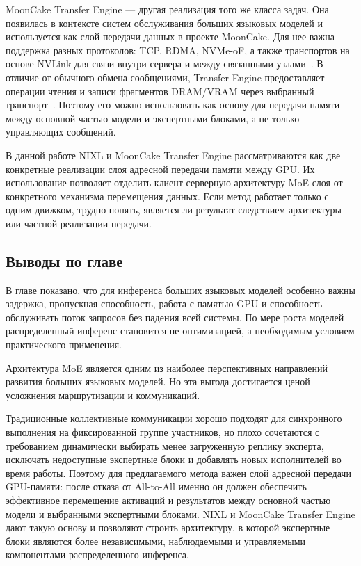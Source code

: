 MoonCake Transfer Engine --- другая реализация того же класса задач. Она появилась в контексте систем обслуживания больших языковых моделей и используется как слой передачи данных в проекте MoonCake. Для нее важна поддержка разных протоколов: TCP, RDMA, NVMe-oF, а также транспортов на основе NVLink для связи внутри сервера и между связанными узлами~\cite{mooncakeSupportedProtocols}. В отличие от обычного обмена сообщениями, Transfer Engine предоставляет операции чтения и записи фрагментов DRAM/VRAM через выбранный транспорт~\cite{mooncakeTransferEngine}. Поэтому его можно использовать как основу для передачи памяти между основной частью модели и экспертными блоками, а не только управляющих сообщений.

В данной работе NIXL и MoonCake Transfer Engine рассматриваются как две конкретные реализации слоя адресной передачи памяти между GPU. Их использование позволяет отделить клиент-серверную архитектуру MoE слоя от конкретного механизма перемещения данных. Если метод работает только с одним движком, трудно понять, является ли результат следствием архитектуры или частной реализации передачи.

\subsection*{Выводы по главе}

В главе показано, что для инференса больших языковых моделей особенно важны задержка, пропускная способность, работа с памятью GPU и способность обслуживать поток запросов без падения всей системы. По мере роста моделей распределенный инференс становится не оптимизацией, а необходимым условием практического применения.

Архитектура MoE является одним из наиболее перспективных направлений развития больших языковых моделей. Но эта выгода достигается ценой усложнения маршрутизации и коммуникаций.

Традиционные коллективные коммуникации хорошо подходят для синхронного выполнения на фиксированной группе участников, но плохо сочетаются с требованием динамически выбирать менее загруженную реплику эксперта, исключать недоступные экспертные блоки и добавлять новых исполнителей во время работы. Поэтому для предлагаемого метода важен слой адресной передачи GPU-памяти: после отказа от All-to-All именно он должен обеспечить эффективное перемещение активаций и результатов между основной частью модели и выбранными экспертными блоками. NIXL и MoonCake Transfer Engine дают такую основу и позволяют строить архитектуру, в которой экспертные блоки являются более независимыми, наблюдаемыми и управляемыми компонентами распределенного инференса.
